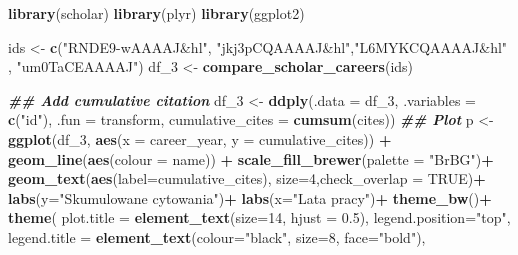 \documentclass[
  12pt,
]{article}
\newenvironment{Shaded}{\begin{snugshade}}{\end{snugshade}}
\newcommand{\AttributeTok}[1]{\textcolor[rgb]{0.13,0.29,0.53}{#1}}
\newcommand{\ConstantTok}[1]{\textcolor[rgb]{0.56,0.35,0.01}{#1}}
\newcommand{\DecValTok}[1]{\textcolor[rgb]{0.00,0.00,0.81}{#1}}
\newcommand{\DocumentationTok}[1]{\textcolor[rgb]{0.56,0.35,0.01}{\textbf{\textit{#1}}}}
\newcommand{\FloatTok}[1]{\textcolor[rgb]{0.00,0.00,0.81}{#1}}
\newcommand{\FunctionTok}[1]{\textcolor[rgb]{0.13,0.29,0.53}{\textbf{#1}}}
\newcommand{\NormalTok}[1]{#1}
\newcommand{\OtherTok}[1]{\textcolor[rgb]{0.56,0.35,0.01}{#1}}
\newcommand{\SpecialCharTok}[1]{\textcolor[rgb]{0.81,0.36,0.00}{\textbf{#1}}}
\newcommand{\StringTok}[1]{\textcolor[rgb]{0.31,0.60,0.02}{#1}}
\begin{document}
\begin{Shaded}
\begin{Highlighting}[]
\FunctionTok{library}\NormalTok{(scholar)}
\FunctionTok{library}\NormalTok{(plyr)}
\FunctionTok{library}\NormalTok{(ggplot2)}

\NormalTok{ids }\OtherTok{\textless{}{-}} \FunctionTok{c}\NormalTok{(}\StringTok{"RNDE9{-}wAAAAJ\&hl"}\NormalTok{, }\StringTok{"jkj3pCQAAAAJ\&hl"}\NormalTok{,}\StringTok{"L6MYKCQAAAAJ\&hl"}\NormalTok{ , }\StringTok{"um0TaCEAAAAJ"}\NormalTok{)}
\NormalTok{df\_3 }\OtherTok{\textless{}{-}} \FunctionTok{compare\_scholar\_careers}\NormalTok{(ids)}

\DocumentationTok{\#\# Add cumulative citation}
\NormalTok{df\_3 }\OtherTok{\textless{}{-}} \FunctionTok{ddply}\NormalTok{(}\AttributeTok{.data =}\NormalTok{ df\_3,}
            \AttributeTok{.variables =} \FunctionTok{c}\NormalTok{(}\StringTok{"id"}\NormalTok{),}
            \AttributeTok{.fun =}\NormalTok{ transform,}
            \AttributeTok{cumulative\_cites =} \FunctionTok{cumsum}\NormalTok{(cites))}
\DocumentationTok{\#\# Plot}
\NormalTok{p }\OtherTok{\textless{}{-}} \FunctionTok{ggplot}\NormalTok{(df\_3, }\FunctionTok{aes}\NormalTok{(}\AttributeTok{x =}\NormalTok{ career\_year, }\AttributeTok{y =}\NormalTok{ cumulative\_cites)) }\SpecialCharTok{+}
  \FunctionTok{geom\_line}\NormalTok{(}\FunctionTok{aes}\NormalTok{(}\AttributeTok{colour =}\NormalTok{ name)) }\SpecialCharTok{+}
  \FunctionTok{scale\_fill\_brewer}\NormalTok{(}\AttributeTok{palette =} \StringTok{"BrBG"}\NormalTok{)}\SpecialCharTok{+}
  \FunctionTok{geom\_text}\NormalTok{(}\FunctionTok{aes}\NormalTok{(}\AttributeTok{label=}\NormalTok{cumulative\_cites), }\AttributeTok{size=}\DecValTok{4}\NormalTok{,}\AttributeTok{check\_overlap =} \ConstantTok{TRUE}\NormalTok{)}\SpecialCharTok{+}
  \FunctionTok{labs}\NormalTok{(}\AttributeTok{y=}\StringTok{"Skumulowane cytowania"}\NormalTok{)}\SpecialCharTok{+}
  \FunctionTok{labs}\NormalTok{(}\AttributeTok{x=}\StringTok{"Lata pracy"}\NormalTok{)}\SpecialCharTok{+}
  \FunctionTok{theme\_bw}\NormalTok{()}\SpecialCharTok{+}
  \FunctionTok{theme}\NormalTok{( }\AttributeTok{plot.title =} \FunctionTok{element\_text}\NormalTok{(}\AttributeTok{size=}\DecValTok{14}\NormalTok{, }\AttributeTok{hjust =} \FloatTok{0.5}\NormalTok{),}
         \AttributeTok{legend.position=}\StringTok{"top"}\NormalTok{,}
         \AttributeTok{legend.title =} \FunctionTok{element\_text}\NormalTok{(}\AttributeTok{colour=}\StringTok{"black"}\NormalTok{, }\AttributeTok{size=}\DecValTok{8}\NormalTok{, }\AttributeTok{face=}\StringTok{"bold"}\NormalTok{),}

\end{Highlighting}
\end{Shaded}
\end{document}
